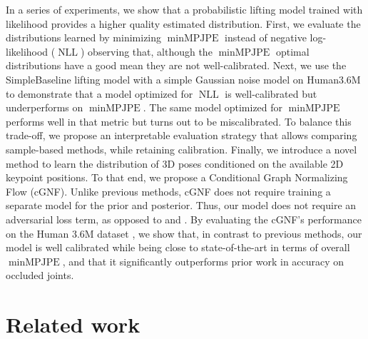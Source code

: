 \documentclass{article} \usepackage{iclr2023_conference,times}
\begin{document}
In a series of experiments, we show that a probabilistic lifting model trained with likelihood provides a higher quality estimated distribution.
First, we evaluate the distributions learned by minimizing $\operatorname{minMPJPE}$ instead of negative log-likelihood ($\operatorname{NLL}$) observing that, although the $\operatorname{minMPJPE}$ optimal distributions have a good mean they are not well-calibrated.
Next, we use the SimpleBaseline \citep{martinez_2017_3dbaseline} lifting model with a simple Gaussian noise model on Human3.6M to demonstrate that a model optimized for $\operatorname{NLL}$ is well-calibrated but underperforms on $\operatorname{minMPJPE}$. The same model optimized for $\operatorname{minMPJPE}$ performs well in that metric but turns out to be miscalibrated. 
To balance this trade-off, we propose an interpretable evaluation strategy that allows comparing sample-based methods, while retaining calibration.
Finally, we introduce a novel method to learn the distribution of 3D poses conditioned on the available 2D keypoint positions.
To that end, we propose a Conditional Graph Normalizing Flow (cGNF).
Unlike previous methods, cGNF does not require training a separate model for the prior and posterior.
Thus, our model does not require an adversarial loss term, as opposed to \citet{Wehrbein_Rudolph_Rosenhahn_Wandt_2021} and \citet{kolotouros2021}.
By evaluating the cGNF's performance on the Human 3.6M dataset \citep{h36m_pami},
we show that, in contrast to previous methods, our model is well calibrated while being close to state-of-the-art in terms of overall $\operatorname{minMPJPE}$, and that it significantly outperforms prior work in accuracy on occluded joints.

\section{Related work}
\end{document}
